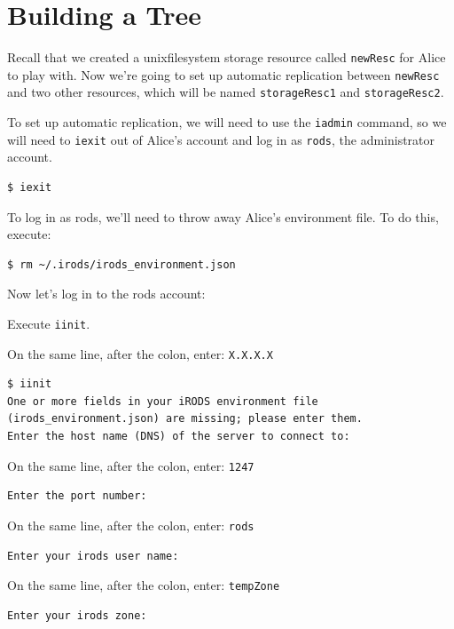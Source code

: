 \documentclass[10pt,oneside]{memoir}
\begin{document}
\section{Building a Tree}

Recall that we created a unixfilesystem storage resource called \texttt{newResc} for Alice to play with. Now we're going to set up automatic replication between \texttt{newResc} and two other resources, which will be named \texttt{storageResc1} and \texttt{storageResc2}.

To set up automatic replication, we will need to use the \texttt{iadmin} command, so we will need to \texttt{iexit} out of Alice's account and log in as \texttt{rods}, the administrator account.

\begin{lstlisting}
$ iexit
\end{lstlisting}

To log in as rods, we'll need to throw away Alice's environment file. To do this, execute:

\begin{lstlisting}
$ rm ~/.irods/irods_environment.json
\end{lstlisting}

Now let's log in to the rods account:

Execute \texttt{iinit}.

On the same line, after the colon, enter: \texttt{X.X.X.X}

\begin{lstlisting}[basicstyle=\scriptsize\ttfamily]
$ iinit
One or more fields in your iRODS environment file (irods_environment.json) are missing; please enter them.
Enter the host name (DNS) of the server to connect to:
\end{lstlisting}

On the same line, after the colon, enter: \texttt{1247}

\begin{lstlisting}[basicstyle=\scriptsize\ttfamily]
Enter the port number:
\end{lstlisting}

On the same line, after the colon, enter: \texttt{rods}

\begin{lstlisting}[basicstyle=\scriptsize\ttfamily]
Enter your irods user name:
\end{lstlisting}

On the same line, after the colon, enter: \texttt{tempZone}

\begin{lstlisting}[basicstyle=\scriptsize\ttfamily]
Enter your irods zone:
\end{lstlisting}
\end{document}
